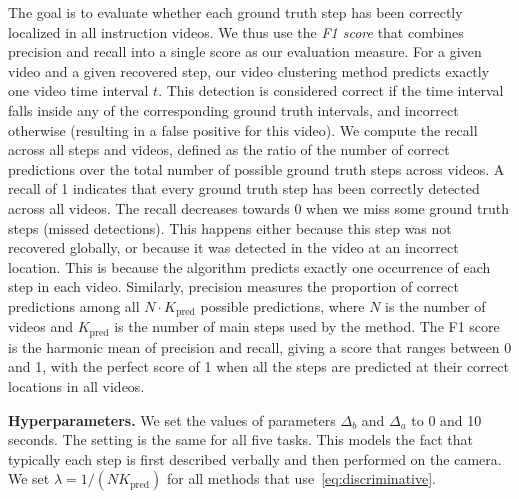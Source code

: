 \documentclass[10pt,twocolumn,letterpaper]{article}
\begin{document}
The goal is to evaluate whether each ground truth step has been correctly localized in all instruction videos. We thus use the \emph{F1 score} that combines precision and recall into a single score as our evaluation measure. 
%
For a given video and a given recovered step, our video clustering method predicts exactly one video time interval $t$. 
This detection is considered correct if the time interval falls inside any of the corresponding ground truth intervals, and incorrect otherwise (resulting in a false positive for this video). 
We compute the recall across all steps and videos, defined as the ratio of the number of correct predictions over the total number of possible ground truth steps across videos. A recall of 1 indicates that every ground truth step has been correctly detected across all videos. 
%
The recall decreases towards 0 when we miss some ground truth steps (missed detections). 
This happens either because this step was not recovered globally, or because it was detected in the video at an incorrect location. This is because the algorithm predicts exactly one occurrence of each step in each video. %
Similarly, precision measures the proportion of correct predictions among all  $N \! \cdot \!K_{\mathrm{pred}}$  possible predictions, where $N$ is the number of videos and $K_{\mathrm{pred}}$
is the number of main steps used by the method. The F1 score is the harmonic mean of precision and recall, giving a score that ranges between 0 and 1, with the perfect score of 1 when all the steps are predicted at their correct locations in all videos.  

\textbf{Hyperparameters.} 
We set the values of parameters $\Delta_b$ and $\Delta_a$ to 0 and 10 seconds. %
The setting is the same for all five tasks.
This models the fact that typically each step is first described verbally and then performed on the camera.
%
We set $\lambda = 1/(N K_{\mathrm{pred}})$ for all methods that use~\eqref{eq:discriminative}.
\end{document}
